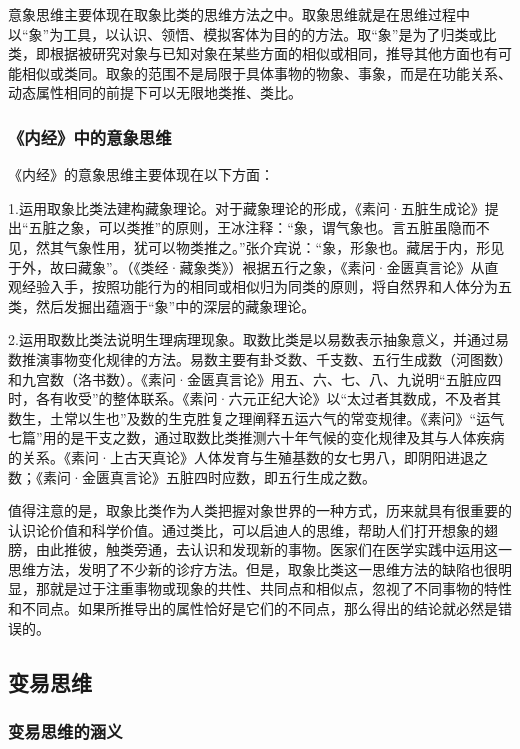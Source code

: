 \documentclass[draft,12pt]{ctexbook}
\begin{document}
意象思维主要体现在取象比类的思维方法之中。取象思维就是在思维过程中以“象”为工具，以认识、领悟、模拟客体为目的的方法。取“象”是为了归类或比类，即根据被研究对象与已知对象在某些方面的相似或相同，推导其他方面也有可能相似或类同。取象的范围不是局限于具体事物的物象、事象，而是在功能关系、动态属性相同的前提下可以无限地类推、类比。

\subsubsection{《内经》中的意象思维}%

《内经》的意象思维主要体现在以下方面：

1.运用取象比类法建构藏象理论。对于藏象理论的形成，《素问·五脏生成论》提出“五脏之象，可以类推”的原则，王冰注释：“象，谓气象也。言五脏虽隐而不见，然其气象性用，犹可以物类推之。”张介宾说：“象，形象也。藏居于内，形见于外，故曰藏象”。（《类经·藏象类》）裉据五行之象，《素问·金匮真言论》从直观经验入手，按照功能行为的相同或相似归为同类的原则，将自然界和人体分为五类，然后发掘出蕴涵于“象”中的深层的藏象理论。

2.运用取数比类法说明生理病理现象。取数比类是以易数表示抽象意义，并通过易数推演事物变化规律的方法。易数主要有卦爻数、千支数、五行生成数（河图数）和九宫数（洛书数）。《素问·金匮真言论》用五、六、七、八、九说明“五脏应四时，各有收受”的整体联系。《素问·六元正纪大论》以“太过者其数成，不及者其数生，土常以生也”及数的生克胜复之理阐释五运六气的常变规律。《素问》“运气七篇”用的是干支之数，通过取数比类推测六十年气候的变化规律及其与人体疾病的关系。《素问·上古天真论》人体发育与生殖基数的女七男八，即阴阳进退之数；《素问·金匮真言论》五脏四时应数，即五行生成之数。

值得注意的是，取象比类作为人类把握对象世界的一种方式，历来就具有很重要的认识论价值和科学价值。通过类比，可以启迪人的思维，帮助人们打开想象的翅膀，由此推彼，触类旁通，去认识和发现新的事物。医家们在医学实践中运用这一思维方法，发明了不少新的诊疗方法。但是，取象比类这一思维方法的缺陷也很明显，那就是过于注重事物或现象的共性、共同点和相似点，忽视了不同事物的特性和不同点。如果所推导出的属性恰好是它们的不同点，那么得出的结论就必然是错误的。

\subsection{变易思维}%

\subsubsection{变易思维的涵义}%
\end{document}
